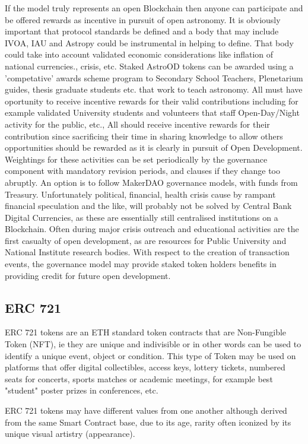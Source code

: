 \documentclass[final,5p,times,twocolumn,authoryear]{elsarticle}
\begin{document}
If the  model truly represents an open Blockchain then anyone can participate and be offered rewards as incentive in pursuit of open astronomy. It is obviously important that protocol standards be defined and a body that may include IVOA, IAU and Astropy could be instrumental in helping to define. That body could take into account validated economic considerations like inflation of national currencies., crisis, etc. Staked AstroOD tokens can be awarded using a 'competative' awards scheme program to Secondary School Teachers, Plenetarium guides, thesis graduate students etc. that work to teach astronomy. All must have oportunity to receive incentive rewards for their valid contributions including for example validated University students and volunteers that staff Open-Day/Night activity for the public, etc., All should receive incentive rewards for their contribution since sacrificing their time in sharing knowledge to allow others opportunities should be rewarded as it is clearly in pursuit of Open Development. Weightings for these activities can be set periodically by the governance component with mandatory revision periods, and clauses if they change too abruptly. An option is to follow MakerDAO governance models, with funds from Treasury. Unfortunately political, financial, health  crisis cause by rampant financial speculation and the like, will probably not be solved by Central Bank Digital Currencies, as these are essentially still centralised institutions on a Blockchain.  Often during major crisis outreach and educational activities are the first casualty of open development, as are resources for Public University and National Institute research bodies. With respect to the creation of transaction events, the governance model may provide staked token holders benefits in providing credit for future open development. 

\subsection{ERC 721 }

ERC 721 tokens are an ETH standard token contracts that are Non-Fungible Token (NFT), ie they are unique and indivisible or in other words can be used to identify a unique event, object or condition. This type of Token may be used on platforms that offer digital collectibles, access keys, lottery tickets, numbered seats for concerts, sports matches or academic meetings, for example best "student" poster prizes in conferences, etc. 

ERC 721 tokens may have different values from one another although derived from the same Smart Contract base, due to its age, rarity often iconized by its unique visual artistry (appearance).
\end{document}
